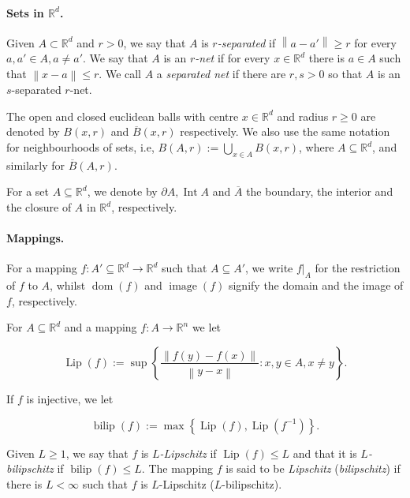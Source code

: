 \documentclass[a4paper, bibliography=totoc]{scrartcl}
\numberwithin{claimcounter}{define}
\newcommand{\R}{\mathbb{R}}
\newcommand{\rest}[2]{#1|_{#2}} %
\newcommand{\lip}{\operatorname{Lip}}
\newcommand{\bilip}{\operatorname{bilip}}
\newcommand{\enorm}[1]{\left\|#1\right\|}
\newcommand{\norm}[1]{\left\|#1\right\|}
\newcommand{\set}[1]{\left\{#1\right\}}
\DeclareMathOperator{\dom}{dom}
\DeclareMathOperator{\img}{image}
\DeclareMathOperator{\inter}{Int}
\newcommand{\cl}[1]{\overline{#1}}
\begin{document}
\paragraph{Sets in $\R^d$.}
Given $A\subset \R^d$ and $r>0$, we say that $A$ is \emph{$r$-separated} if $\norm{a-a'}\geq r$ for every $a,a'\in A, a\neq a'$. We say that $A$ is an \emph{$r$-net} if for every $x\in \R^d$ there is $a\in A$ such that $\norm{x-a}\leq r$. We call $A$ a \emph{separated net} if there are $r,s>0$ so that $A$ is an $s$-separated $r$-net.

The open and closed euclidean balls with centre $x\in\R^{d}$ and radius $r\geq 0$ are denoted by $B(x,r)$ and $\cl{B}(x,r)$ respectively. We also use the same notation for neighbourhoods of sets, i.e, $B(A,r):=\bigcup_{x\in A}B(x,r)$, where $A\subseteq\R^d$, and similarly for $\cl{B}(A,r)$.


For a set $A\subseteq\R^d$, we denote by $\partial A, \inter A$ and $\cl{A}$ the boundary, the interior and the closure of $A$ in $\R^d$, respectively.

\paragraph{Mappings.}
For a mapping $f\colon A'\subseteq\R^d\to\R^d$ such that $A\subseteq A'$, we write $\rest{f}{A}$ for the restriction of $f$ to $A$, whilst $\dom(f)$ and $\img(f)$ signify the domain and the image of $f$, respectively.

For $A\subseteq\R^{d}$ and a mapping $f\colon A\to\R^{n}$ we let
\begin{linenomath}
	\begin{equation*}
	\lip(f):=\sup\left\{\frac{\enorm{f(y)-f(x)}}{\enorm{y-x}}\colon x,y\in A, x\neq y\right\}.
	\end{equation*}
\end{linenomath}
If $f$ is injective, we let
\begin{linenomath}
	\begin{equation*}
	\bilip(f):=\max\set{\lip(f),\lip(f^{-1})}.
	\end{equation*}
\end{linenomath}
Given $L\geq 1$, we say that $f$ is $L$\emph{-Lipschitz} if $\lip(f)\leq L$ and that it is \emph{$L$-bilipschitz} if $\bilip(f)\leq L$. The mapping $f$ is said to be \emph{Lipschitz} (\emph{bilipschitz}) if there is $L<\infty$ such that $f$ is $L$-Lipschitz ($L$-bilipschitz).
\end{document}
